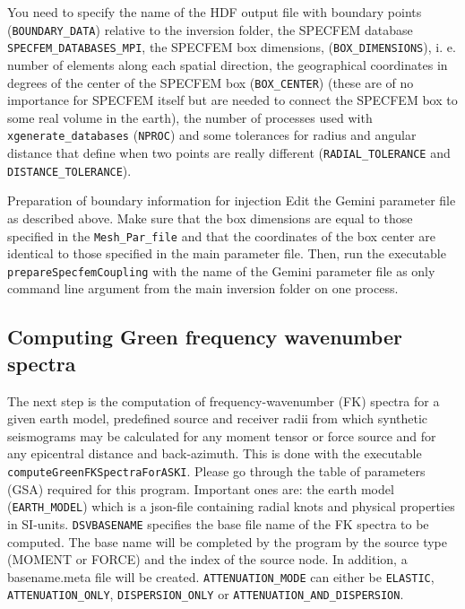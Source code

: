 You need to specify the name of the HDF output file with boundary points (\verb+BOUNDARY_DATA+) relative to the inversion folder, the SPECFEM database
\verb+SPECFEM_DATABASES_MPI+, the SPECFEM box dimensions, (\verb+BOX_DIMENSIONS+), i. e. number of elements along each spatial direction, the geographical coordinates in degrees of the center of the SPECFEM box (\verb+BOX_CENTER+) (these are of no importance for SPECFEM itself but are needed to connect the SPECFEM box to some real volume in the earth), the number of processes used with \verb+xgenerate_databases+ (\verb+NPROC+) and some tolerances for radius and angular distance that define when two points are really different (\verb+RADIAL_TOLERANCE+ and \verb+DISTANCE_TOLERANCE+).
%
\begin{actionbox}[label={action:boundary-info},float=h!]{Preparation of boundary information for injection}
   Edit the Gemini parameter file as described above. Make sure that the box dimensions are equal to those specified in the \verb+Mesh_Par_file+ and that the coordinates of the box center are identical to those specified in the main parameter file. Then, run the executable \verb+prepareSpecfemCoupling+ with the name of the Gemini parameter file as only command line argument from the main inversion folder on one process.
\end{actionbox}
%
\subsection{Computing Green frequency wavenumber spectra}
\label{sec:fkspectra}
%
 The next step is the computation of frequency-wavenumber (FK) spectra for a given earth model, predefined source and receiver radii from which synthetic seismograms may be calculated for any moment tensor or force source and for any epicentral distance and back-azimuth. This is done with the executable \verb+computeGreenFKSpectraForASKI+. Please go through the table of parameters (GSA) required for this program. Important ones are: the earth model (\verb+EARTH_MODEL+) which is a json-file containing radial knots and physical properties in SI-units. \verb+DSVBASENAME+ specifies the base file name of the FK spectra to be computed. The base name will be completed by the program by the source type (MOMENT or FORCE) and the index of the source node. In addition, a basename.meta file will be created. \verb+ATTENUATION_MODE+ can either be \verb+ELASTIC+, \verb+ATTENUATION_ONLY+, \verb+DISPERSION_ONLY+ or \verb+ATTENUATION_AND_DISPERSION+.

